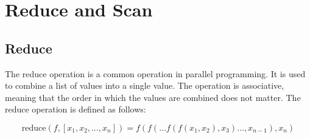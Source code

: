 \section{Reduce and Scan}

\subsection{Reduce}

The reduce operation is a common operation in parallel programming. It is used to combine a list of values into a single value. The operation is associative, meaning that the order in which the values are combined does not matter. The reduce operation is defined as follows:

\[
\text{{reduce}}(f, [x_1, x_2, \ldots, x_n]) = f(f(\ldots f(f(x_1, x_2), x_3) \ldots, x_{n-1}), x_n)
\]